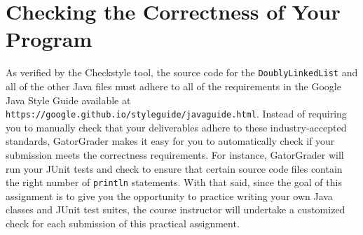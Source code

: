 \documentclass[11pt]{article}
\newcommand{\mainprogram}{\lstinline{DoublyLinkedList}}
\newcommand{\gradlebuild}{\command{gradle build}}
\newcommand{\command}[1]{``\lstinline{#1}''}
\newcommand{\program}[1]{\lstinline{#1}}
\newcommand{\url}[1]{\lstinline{#1}}
\newcommand{\step}[1]{``{#1}''}
\begin{document}


\section*{Checking the Correctness of Your Program}

As verified by the Checkstyle tool, the source code for the \mainprogram{} and
all of the other Java files must adhere to all of the requirements in the Google
Java Style Guide available at
\url{https://google.github.io/styleguide/javaguide.html}. Instead of requiring
you to manually check that your deliverables adhere to these industry-accepted
standards, GatorGrader makes it easy for you to automatically check if your
submission meets the correctness requirements. For instance, GatorGrader will
run your JUnit tests and check to ensure that certain source code files contain
the right number of \program{println} statements. With that said, since the
goal of this assignment is to give you the opportunity to practice writing
your own Java classes and JUnit test suites, the course instructor will
undertake a customized check for each submission of this practical assignment.
\end{document}
